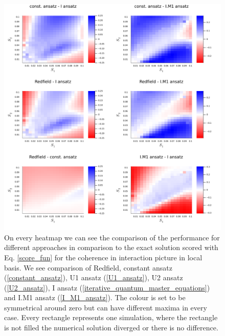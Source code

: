 \newpage
\begin{figure}[H]
\centering
\includegraphics[width=1.0\textwidth]{img/scans/hr_scan_2_scorediff_intloc23.png}
\caption{On every heatmap we can see the comparison of the performance for different approaches in comparison to the exact solution scored with Eq. \ref{score_fun} for the coherence in interaction picture in local basis. We see comparison of Redfield, constant ansatz (\ref{constant_ansatz}), U1 ansatz (\ref{U1_ansatz}), U2 ansatz (\ref{U2_ansatz}), I ansatz (\ref{iterative_quantum_master_equations}) and I.M1 ansatz (\ref{I_M1_ansatz}). The colour is set to be symmetrical around zero but can have different maxima in every case. Every rectangle represents one simulation, where the rectangle is not filled the numerical solution diverged or there is no difference.}
\label{img:hr_scan_2_scorediff_intloc23}
\end{figure}

